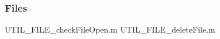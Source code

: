 \documentclass[12pt]{article}
\begin{document}
\subsubsection{Files}
							{UTIL_FILE_checkFileOpen.m}
								{UTIL_FILE_deleteFile.m}
																									 







\end{document}
